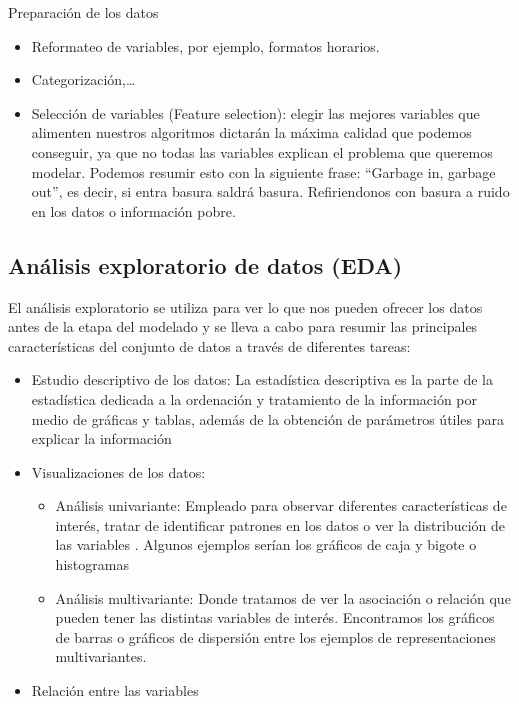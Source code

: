 \documentclass[12pt,a4paper,]{book}
\providecommand{\tightlist}{%
  \setlength{\itemsep}{0pt}\setlength{\parskip}{0pt}}
\numberwithin{dummy}{section}
\theoremstyle{ocrenumbox}
\theoremstyle{blacknumex}
\theoremstyle{blacknumbox}
\theoremstyle{ocrenum}
\theoremstyle{ocrenum}
\begin{document}
Preparación de los datos

\begin{itemize}
\tightlist
\item
  Reformateo de variables, por ejemplo, formatos horarios.
\item
  Categorización,\ldots{}
\item
  Selección de variables (Feature selection): elegir las mejores
  variables que alimenten nuestros algoritmos dictarán la máxima calidad
  que podemos conseguir, ya que no todas las variables explican el
  problema que queremos modelar. Podemos resumir esto con la siguiente
  frase: ``Garbage in, garbage out'', es decir, si entra basura saldrá
  basura. Refiriendonos con basura a ruido en los datos o información
  pobre.
\end{itemize}

\hypertarget{anuxe1lisis-exploratorio-de-datos-eda}{%
\subsection{Análisis exploratorio de datos
(EDA)}\label{anuxe1lisis-exploratorio-de-datos-eda}}

El análisis exploratorio se utiliza para ver lo que nos pueden ofrecer
los datos antes de la etapa del modelado y se lleva a cabo para resumir
las principales características del conjunto de datos a través de
diferentes tareas:

\begin{itemize}
\item
  Estudio descriptivo de los datos: La estadística descriptiva es la
  parte de la estadística dedicada a la ordenación y tratamiento de la
  información por medio de gráficas y tablas, además de la obtención de
  parámetros útiles para explicar la información
\item
  Visualizaciones de los datos:

  \begin{itemize}
  \tightlist
  \item
    Análisis univariante: Empleado para observar diferentes
    características de interés, tratar de identificar patrones en los
    datos o ver la distribución de las variables . Algunos ejemplos
    serían los gráficos de caja y bigote o histogramas
  \item
    Análisis multivariante: Donde tratamos de ver la asociación o
    relación que pueden tener las distintas variables de interés.
    Encontramos los gráficos de barras o gráficos de dispersión entre
    los ejemplos de representaciones multivariantes.
  \end{itemize}
\item
  Relación entre las variables
\end{itemize}
\end{document}
